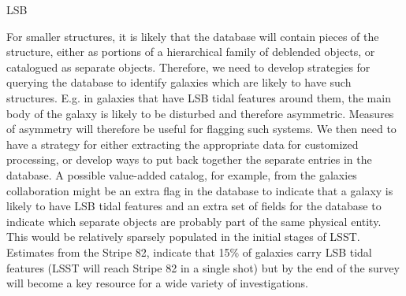 \begin{tasklist}{LSB}
\begin{task}
{For smaller structures, it is likely that the database will contain pieces of the structure, either as portions  of a hierarchical  family of deblended objects, or catalogued  as separate objects.  Therefore, we need to develop strategies for querying the database to identify galaxies which are likely to have such structures. E.g. in galaxies that have LSB tidal features around them, the main body of the galaxy is likely to be disturbed and therefore asymmetric. Measures of asymmetry will therefore be useful for flagging such systems. We then need to have a strategy for either extracting the appropriate data for customized  processing, or develop ways to put back together  the separate  entries  in the database. A possible value-added catalog, for example, from the galaxies collaboration might be an extra flag in the database to indicate that a galaxy is likely to have LSB tidal features and an extra  set of fields for the database to indicate  which separate objects are probably part of the same physical entity.
\\
This would be relatively sparsely  populated in the  initial stages of LSST. Estimates from the Stripe 82, indicate that 15\% of galaxies carry LSB tidal features (LSST will reach Stripe 82 in a single shot) but by the end of the survey will become a key resource for a wide variety of investigations.
}
\end{task}





\end{tasklist}

